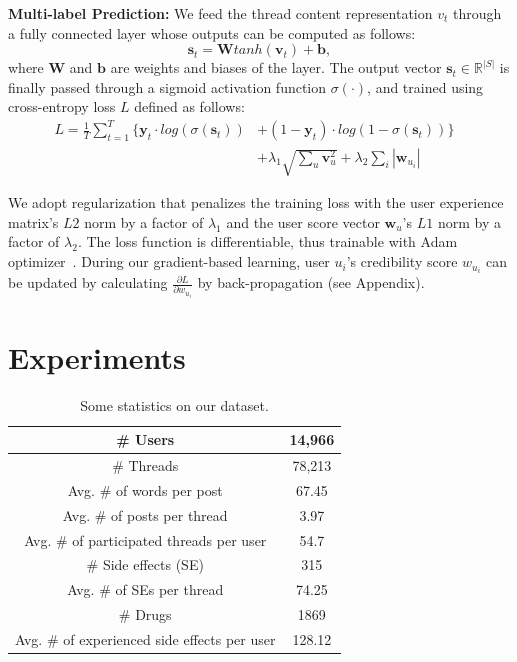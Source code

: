 \documentclass{bmcart}
\begin{document}
\textbf{Multi-label Prediction:} We feed the thread content
representation $v_t$ through a fully connected layer whose outputs can be computed as follows:
\begin{equation}\label{eq:dense}
\boldsymbol{s}_{t}=\boldsymbol{W}tanh(\boldsymbol{v}_{t})+\boldsymbol{b}, 
\end{equation}
where $\boldsymbol{W}$ and $\boldsymbol{b}$ are weights and biases of
the layer. The output vector $\boldsymbol{s}_{t} \in \mathbb{R}^{|S|}$
is finally passed through a sigmoid activation function $\sigma(\cdot)$,
and trained using cross-entropy loss $L$ defined as follows:   
\begin{equation}\label{eq:overall_loss}
  \begin{aligned}
    L=\frac{1}{T}\sum^T_{t=1}\{\boldsymbol{y}_{t} \cdot log(\sigma(\boldsymbol{s}_{t}))&+(1-\boldsymbol{y}_{t})\cdot log(1-\sigma(\boldsymbol{s}_{t}))\}& \\ 
    &+\lambda_1\sqrt{\sum_{u}\boldsymbol{v}_{u}^{2}}+\lambda_2\sum_{i}{{|\boldsymbol{w}_{u_{i}}|}}&
  \end{aligned}
\end{equation}

We adopt regularization that penalizes the training loss with the user
experience matrix's $L2$ norm by a factor of $\lambda_1$ and the user score vector $\boldsymbol{w}_{u}$'s $L1$ norm by a factor of $\lambda_2$. The loss function is differentiable, thus
trainable with Adam optimizer~\cite{kingma2015adam}. 
During our gradient-based learning, 
user ${u_i}$'s credibility score $w_{u_i}$ can be updated by calculating 
$\frac{\partial L}{\partial w_{u_i}}$ by back-propagation (see Appendix).

\section{Experiments}

\begin{table}[]
    \centering
    \begin{tabular}{|c|c|} \hline
        \# Users & 14,966 \\ \hline
        \# Threads & 78,213 \\ \hline
        Avg. \# of words per post & 67.45 \\ \hline
        Avg. \# of posts per thread & 3.97 \\ \hline
        Avg. \# of participated threads per user & 54.7 \\ \hline
        \# Side effects (SE) & 315 \\ \hline
        Avg. \# of SEs per thread & 74.25 \\ \hline
        \# Drugs & 1869 \\ \hline
        Avg. \# of experienced side effects per user & 128.12 \\ \hline
    \end{tabular}
    \caption{Some statistics on our dataset.}
    \label{table:dataset_statistics}
\end{table}
\end{document}
